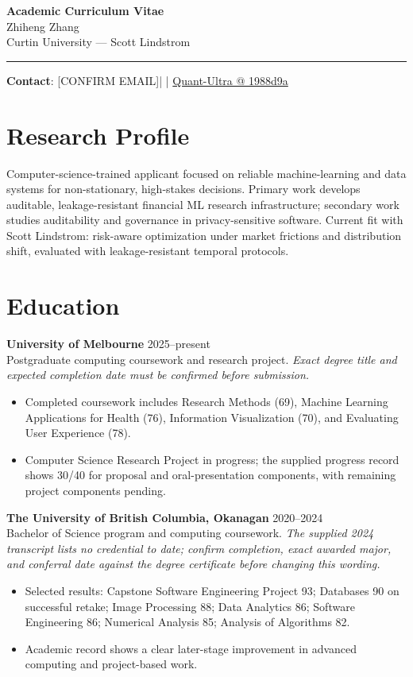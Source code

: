 \documentclass[11pt]{article}
\makeatletter
\newcommand{\ApplicantName}{Zhiheng Zhang}
\newcommand{\ApplicantEmail}{[CONFIRM EMAIL]}
\newcommand{\ApplicantPhone}{[CONFIRM PHONE]}
\newcommand{\ApplicantGitHub}{\href{https://github.com/zhiheng-zhang-Mera/Quant-Ultra/tree/1988d9a8530da91a8158de864d098ea869098923}{Quant-Ultra @ 1988d9a}}
\makeatother
\begin{document}
\begin{center}
{\LARGE\bfseries Academic Curriculum Vitae}\\[0.25em]
{\large \ApplicantName}\\
Curtin University --- Scott Lindstrom
\end{center}
\vspace{0.35em}\hrule\vspace{0.65em}

\textbf{Contact}: \ApplicantEmail\quad | \quad \ApplicantPhone\quad | \quad \ApplicantGitHub

\section*{Research Profile}
Computer-science-trained applicant focused on reliable machine-learning and data systems for non-stationary, high-stakes decisions. Primary work develops auditable, leakage-resistant financial ML research infrastructure; secondary work studies auditability and governance in privacy-sensitive software. Current fit with Scott Lindstrom: risk-aware optimization under market frictions and distribution shift, evaluated with leakage-resistant temporal protocols.

\section*{Education}
\textbf{University of Melbourne} \hfill 2025--present\\
Postgraduate computing coursework and research project. \textit{Exact degree title and expected completion date must be confirmed before submission.}
\begin{itemize}
\item Completed coursework includes Research Methods (69), Machine Learning Applications for Health (76), Information Visualization (70), and Evaluating User Experience (78).
\item Computer Science Research Project in progress; the supplied progress record shows 30/40 for proposal and oral-presentation components, with remaining project components pending.
\end{itemize}

\textbf{The University of British Columbia, Okanagan} \hfill 2020--2024\\
Bachelor of Science program and computing coursework. \textit{The supplied 2024 transcript lists no credential to date; confirm completion, exact awarded major, and conferral date against the degree certificate before changing this wording.}
\begin{itemize}
\item Selected results: Capstone Software Engineering Project 93; Databases 90 on successful retake; Image Processing 88; Data Analytics 86; Software Engineering 86; Numerical Analysis 85; Analysis of Algorithms 82.
\item Academic record shows a clear later-stage improvement in advanced computing and project-based work.
\end{itemize}
\end{document}
